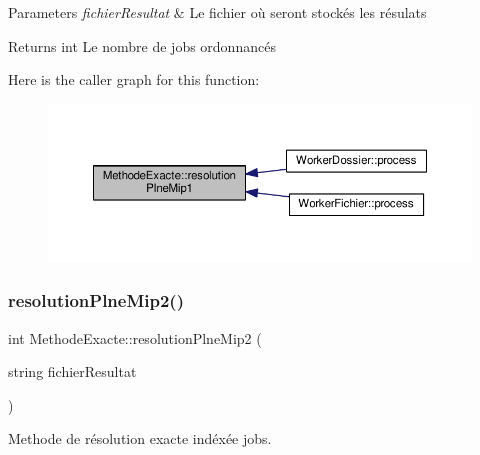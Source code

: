\begin{DoxyParams}{Parameters}
{\em fichier\+Resultat} & Le fichier où seront stockés les résulats \\
\hline
\end{DoxyParams}
\begin{DoxyReturn}{Returns}
int Le nombre de jobs ordonnancés 
\end{DoxyReturn}
Here is the caller graph for this function\+:\nopagebreak
\begin{figure}[H]
\begin{center}
\leavevmode
\includegraphics[width=350pt]{classMethodeExacte_a202241adc56888d12cf6769a6cab5412_icgraph}
\end{center}
\end{figure}
\mbox{\label{classMethodeExacte_ae3a50fe055b468baa284287ba61ba381}} 
\subsubsection{\texorpdfstring{resolution\+Plne\+Mip2()}{resolutionPlneMip2()}}
{\footnotesize\ttfamily int Methode\+Exacte\+::resolution\+Plne\+Mip2 (\begin{DoxyParamCaption}\item[{string}]{fichier\+Resultat }\end{DoxyParamCaption})}



Methode de résolution exacte indéxée jobs. 


